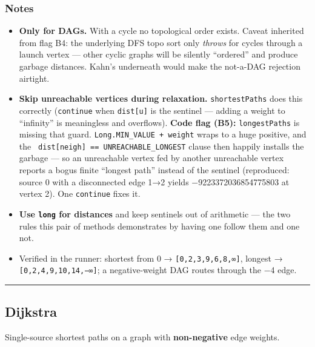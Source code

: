 \documentclass[
  10pt,
  letterpaper,
  onecolumn]{article}
\providecommand{\tightlist}{%
  \setlength{\itemsep}{0pt}\setlength{\parskip}{0pt}}
\begin{document}
\hypertarget{notes-15}{%
\subsubsection{Notes}\label{notes-15}}

\begin{itemize}
\tightlist
\item
  \textbf{Only for DAGs.} With a cycle no topological order exists.
  Caveat inherited from flag B4: the underlying DFS topo sort only
  \emph{throws} for cycles through a launch vertex --- other cyclic
  graphs will be silently ``ordered'' and produce garbage distances.
  Kahn's underneath would make the not-a-DAG rejection airtight.
\item
  \textbf{Skip unreachable vertices during relaxation.}
  \texttt{shortestPaths} does this correctly (\texttt{continue} when
  \texttt{dist{[}u{]}} is the sentinel --- adding a weight to
  ``infinity'' is meaningless and overflows). \textbf{Code flag (B5):}
  \texttt{longestPaths} is missing that guard.
  \texttt{Long.MIN\_VALUE\ +\ weight} wraps to a huge positive, and the
  \texttt{\textbar{}\textbar{}\ dist{[}neigh{]}\ ==\ UNREACHABLE\_LONGEST}
  clause then happily installs the garbage --- so an unreachable vertex
  fed by another unreachable vertex reports a bogus finite ``longest
  path'' instead of the sentinel (reproduced: source 0 with a
  disconnected edge 1→2 yields −9223372036854775803 at vertex 2). One
  \texttt{continue} fixes it.
\item
  \textbf{Use \texttt{long} for distances} and keep sentinels out of
  arithmetic --- the two rules this pair of methods demonstrates by
  having one follow them and one not.
\item
  Verified in the runner: shortest from 0 →
  \texttt{{[}0,2,3,9,6,8,∞{]}}, longest →
  \texttt{{[}0,2,4,9,10,14,−∞{]}}; a negative-weight DAG routes through
  the −4 edge.
\end{itemize}

\begin{center}\rule{0.5\linewidth}{0.5pt}\end{center}

\hypertarget{dijkstra}{%
\subsection{Dijkstra}\label{dijkstra}}

Single-source shortest paths on a graph with \textbf{non-negative} edge
weights.
\end{document}
